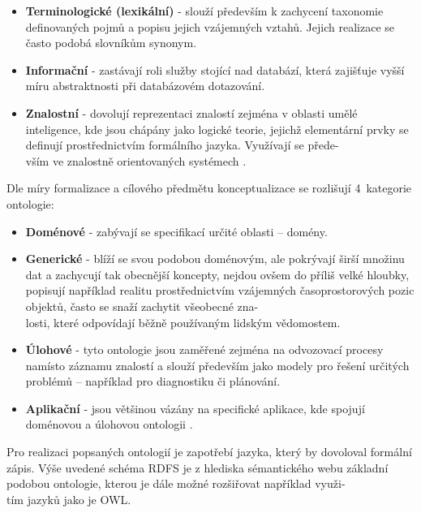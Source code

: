 \documentclass{projekt}
\begin{document}
\begin {itemize}

\item \textbf{Terminologické (lexikální)} - slouží především k zachycení taxonomie definovaných pojmů a popisu jejich vzájemných vztahů. Jejich realizace se často podobá slovníkům synonym.
\item \textbf{Informační} - zastávají roli služby stojící nad databází, která zajišťuje vyšší míru abstraktnosti při databázovém dotazování.
\item \textbf{Znalostní} - dovolují reprezentaci znalostí zejména v oblasti umělé inteligence, kde jsou chápány jako logické teorie, jejichž elementární prvky se definují prostřednictvím formálního jazyka. Využívají se přede-\\vším ve znalostně orientovaných systémech \cite{_9}.

\end{itemize}

Dle míry formalizace a cílového předmětu konceptualizace se rozlišují 4~kategorie ontologie:

\begin {itemize}

\item \textbf{Doménové} - zabývají se specifikací určité oblasti – domény.
\item \textbf{Generické} - blíží se svou podobou doménovým, ale pokrývají širší množinu dat a zachycují tak obecnější koncepty, nejdou ovšem do příliš velké hloubky, popisují například realitu prostřednictvím vzájemných časoprostorových pozic objektů, často se snaží zachytit všeobecné zna-\\losti, které odpovídají běžně používaným lidským vědomostem.
\item \textbf{Úlohové} - tyto ontologie jsou zaměřené zejména na odvozovací procesy namísto záznamu znalostí a slouží především jako modely pro řešení určitých problémů – například pro diagnostiku či plánování.
\item \textbf{Aplikační} - jsou většinou vázány na specifické aplikace, kde spojují doménovou a úlohovou ontologii \cite{_10}.
\end{itemize}

Pro realizaci popsaných ontologií je zapotřebí jazyka, který by dovoloval formální zápis. Výše uvedené schéma RDFS je z hlediska sémantického webu základní podobou ontologie, kterou je dále možné rozšiřovat například využi-\\tím jazyků jako je OWL.
\end{document}
